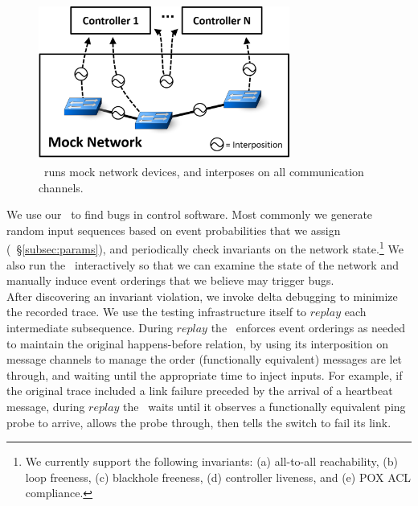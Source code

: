 \begin{figure}[tb]
    \includegraphics[width=3.25in]{../diagrams/architecture/Debugger_Architecture.png}
    \caption[]{\label{fig:architecture} \projectname~runs mock
    network devices, and interposes on all communication
    channels.}
    \vspace{-1.2em}
\end{figure}

We use our \tester~to find bugs in control software.
Most commonly we generate random input
sequences based on event probabilities that we assign (\cf~\S\ref{subsec:params}), and periodically
check invariants on the network state.\footnote{We currently support the following invariants:
  (a) all-to-all reachability, (b) loop freeness, (c) blackhole freeness, (d) controller
liveness, and (e) POX ACL compliance.
}
We also run the \tester~interactively
so that we can examine the state of the network
and manually induce event orderings that we believe may trigger bugs.\\[0.5ex]
%
 After discovering an invariant
violation, we invoke delta debugging to minimize the recorded trace. We use the
testing infrastructure itself to $replay$ each intermediate subsequence.
During $replay$ the \tester~enforces event orderings as needed to maintain the original happens-before
relation, by using its interposition on message channels to
manage the order (functionally equivalent) messages are let through,
and waiting until the appropriate time to inject inputs. For example, if the
original trace included a link failure preceded by the arrival of a heartbeat
message, during $replay$ the \tester~waits until it observes
a functionally equivalent ping probe to arrive, allows the probe
through, then tells the switch to fail its link. %

